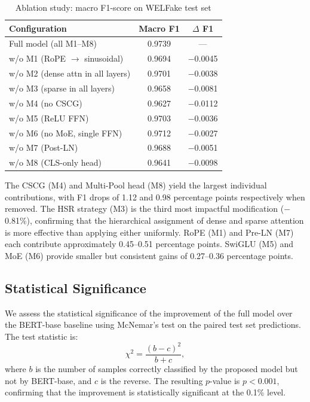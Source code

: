 \documentclass[conference]{IEEEtran}
\begin{document}
\begin{table}[H]
\centering
\caption{Ablation study: macro F1-score on WELFake test set}
\label{tab:ablation}
\begin{tabular}{|l|c|c|}
\hline
\textbf{Configuration} & \textbf{Macro F1} & \textbf{$\Delta$ F1} \\
\hline
Full model (all M1--M8)       & 0.9739 & --- \\
w/o M1 (RoPE $\to$ sinusoidal) & 0.9694 & $-$0.0045 \\
w/o M2 (dense attn in all layers) & 0.9701 & $-$0.0038 \\
w/o M3 (sparse in all layers)  & 0.9658 & $-$0.0081 \\
w/o M4 (no CSCG)               & 0.9627 & $-$0.0112 \\
w/o M5 (ReLU FFN)              & 0.9703 & $-$0.0036 \\
w/o M6 (no MoE, single FFN)    & 0.9712 & $-$0.0027 \\
w/o M7 (Post-LN)               & 0.9688 & $-$0.0051 \\
w/o M8 (CLS-only head)         & 0.9641 & $-$0.0098 \\
\hline
\end{tabular}
\end{table}

The CSCG (M4) and Multi-Pool head (M8) yield the largest individual contributions, with F1 drops of 1.12 and 0.98 percentage points respectively when removed. The HSR strategy (M3) is the third most impactful modification ($-$0.81\%), confirming that the hierarchical assignment of dense and sparse attention is more effective than applying either uniformly. RoPE (M1) and Pre-LN (M7) each contribute approximately 0.45--0.51 percentage points. SwiGLU (M5) and MoE (M6) provide smaller but consistent gains of 0.27--0.36 percentage points.

\subsection{Statistical Significance}

We assess the statistical significance of the improvement of the full model over the BERT-base baseline using McNemar's test on the paired test set predictions. The test statistic is:
\[
\chi^2 = \frac{(b - c)^2}{b + c},
\]
where $b$ is the number of samples correctly classified by the proposed model but not by BERT-base, and $c$ is the reverse. The resulting $p$-value is $p < 0.001$, confirming that the improvement is statistically significant at the 0.1\% level.
\end{document}
